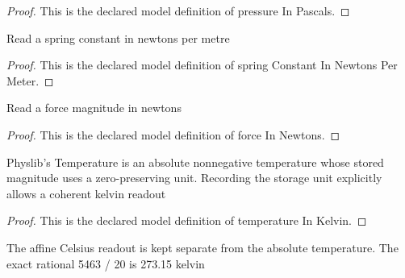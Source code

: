 \begin{proof}
  This is the declared model definition of pressure In Pascals.
\end{proof}
\begin{definition}
  \label{def:physics:phyx-mini-0375:phyxminiproblems-problemphyxmini0375-springconstantinnewtonspermeter}
  Read a spring constant in newtons per metre
\end{definition}
\begin{proof}
  This is the declared model definition of spring Constant In Newtons Per Meter.
\end{proof}
\begin{definition}
  \label{def:physics:phyx-mini-0375:phyxminiproblems-problemphyxmini0375-forceinnewtons}
  Read a force magnitude in newtons
\end{definition}
\begin{proof}
  This is the declared model definition of force In Newtons.
\end{proof}
\begin{definition}
  \label{def:physics:phyx-mini-0375:phyxminiproblems-problemphyxmini0375-temperatureinkelvin}
  Physlib's Temperature is an absolute nonnegative temperature whose stored magnitude uses a zero-preserving unit. Recording the storage unit explicitly allows a coherent kelvin readout
\end{definition}
\begin{proof}
  This is the declared model definition of temperature In Kelvin.
\end{proof}
\begin{definition}
  \label{def:physics:phyx-mini-0375:phyxminiproblems-problemphyxmini0375-temperatureindegreescelsius}
  The affine Celsius readout is kept separate from the absolute temperature. The exact rational 5463 / 20 is 273.15 kelvin
\end{definition}
